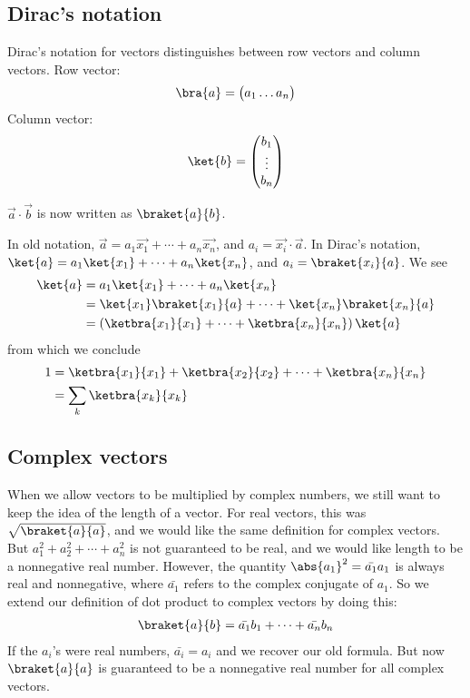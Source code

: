 \documentclass[12pt, oneside, letterpaper, fleqn]{article}
\begin{document}
\subsection{Dirac's notation}
Dirac's notation for vectors distinguishes between row vectors and column
vectors. Row vector:
\begin{align}
\bra{a} = \begin{pmatrix}a_1 \hdots a_n\end{pmatrix}
\end{align}
Column vector:
\begin{align}
\ket{b} = \begin{pmatrix}b_1\\
\vdots\\
b_n
\end{pmatrix}
\end{align}

$\vec{a} \cdot \vec{b}$ is now written as $\braket{a}{b}$.

In old notation, $\vec{a} = a_1\vec{x_1} +\dotsb+ a_n\vec{x_n}$, and
$a_i = \vec{x_i} \cdot \vec{a}$. In Dirac's notation, $\ket{a} =
a_1\ket{x_1} +\dotsb+ a_n\ket{x_n}$, and $a_i = \braket{x_i}{a}$. We see
\begin{align*}
\ket{a} &= a_1\ket{x_1} +\dotsb+ a_n\ket{x_n}\\
&= \ket{x_1}\braket{x_1}{a} +\dotsb+ \ket{x_n}\braket{x_n}{a}\\
&= \left(\ketbra{x_1}{x_1} +\dotsb+ \ketbra{x_n}{x_n}\right)\ket{a}
\end{align*}
from which we conclude
\begin{align}\begin{split}\label{eq:finite_id}
1 &= \ketbra{x_1}{x_1} + \ketbra{x_2}{x_2} +\dotsb+ \ketbra{x_n}{x_n}\\
&= \sum_k \ketbra{x_k}{x_k}
\end{split}\end{align}

\subsection{Complex vectors}
When we allow vectors to be multiplied by complex numbers, we still want
to keep the idea of the length of a vector. For real vectors, this was
$\sqrt{\braket{a}{a}}$, and we would like the same definition for
complex vectors. But $a_1^2 + a_2^2 + \dotsb + a_n^2$ is not guaranteed
to be real, and we would like length to be a nonnegative real number.
However, the quantity $\abs{a_1}^2 = \bar{a_1}a_1$ is always real and
nonnegative, where $\bar{a_1}$ refers to the complex conjugate of $a_1$. So
we extend our definition of dot product to complex vectors by doing
this:
\begin{align}
\braket{a}{b} = \bar{a_1}b_1 + \dotsb + \bar{a_n}b_n
\end{align}
If the $a_i$'s were real numbers, $\bar{a_i} = a_i$ and we recover our
old formula. But now $\braket{a}{a}$ is guaranteed to be a nonnegative
real number for all complex vectors.
\end{document}
